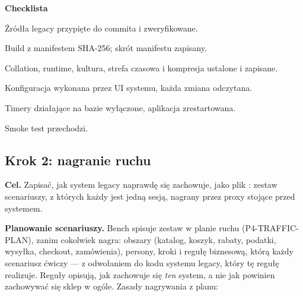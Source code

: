 \textbf{Checklista}
\begin{checklista}
  \item Źródła legacy przypięte do commita i zweryfikowane.
  \item Build z manifestem SHA-256; skrót manifestu zapisany.
  \item Collation, runtime, kultura, strefa czasowa i kompresja ustalone i zapisane.
  \item Konfiguracja wykonana przez UI systemu, każda zmiana odczytana.
  \item Timery działające na bazie wyłączone, aplikacja zrestartowana.
  \item Smoke test przechodzi.
\end{checklista}


\subsection{Krok 2: nagranie ruchu}\label{sec:procedura-krok2}

\textbf{Cel.} Zapisać, jak system legacy naprawdę się zachowuje, jako plik
: zestaw scenariuszy, z których każdy jest jedną sesją, nagrany przez
proxy  stojące przed systemem.

\textbf{Planowanie scenariuszy.} Bench spisuje zestaw w planie ruchu (P4-TRAFFIC-PLAN),
zanim cokolwiek nagra: obszary (katalog, koszyk, rabaty, podatki, wysyłka, checkout,
zamówienia), persony, kroki i regułę biznesową, którą każdy scenariusz ćwiczy --- z
odwołaniem do kodu systemu legacy, który tę regułę realizuje. Reguły opisują, jak
zachowuje się \emph{ten} system, a nie jak powinien zachowywać się sklep w ogóle. Zasady
nagrywania z planu:

